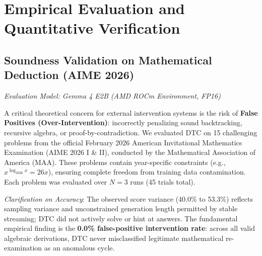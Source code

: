 \documentclass[11pt,a4paper]{article}
\begin{document}
\section{Empirical Evaluation and Quantitative Verification}

\subsection{Soundness Validation on Mathematical Deduction (AIME 2026)}
\textit{Evaluation Model: Gemma 4 E2B (AMD ROCm Environment, FP16)}

A critical theoretical concern for external intervention systems is the risk of \textbf{False Positives (Over-Intervention)}: incorrectly penalizing sound backtracking, recursive algebra, or proof-by-contradiction. We evaluated DTC on 15 challenging problems from the official February 2026 American Invitational Mathematics Examination (AIME 2026 I \& II), conducted by the Mathematical Association of America (MAA). These problems contain year-specific constraints (e.g., $x^{\log_{2026} x} = 26x$), ensuring complete freedom from training data contamination. Each problem was evaluated over $N=3$ runs (45 trials total).

\begin{table}[htbp]
\centering
\small
\caption{Soundness evaluation on official MAA AIME 2026 examination (15 problems, $N=3$).}
\label{tab:aime}
\end{table}

\noindent\textit{Clarification on Accuracy}: The observed score variance (40.0\% to 53.3\%) reflects sampling variance and unconstrained generation length permitted by stable streaming; DTC did not actively solve or hint at answers. The fundamental empirical finding is the \textbf{0.0\% false-positive intervention rate}: across all valid algebraic derivations, DTC never misclassified legitimate mathematical re-examination as an anomalous cycle.
\end{document}
